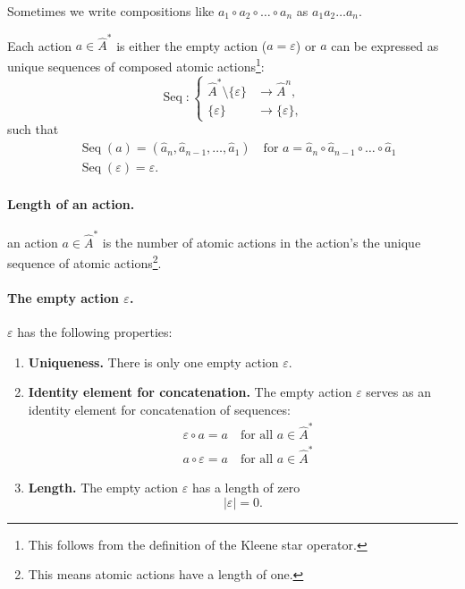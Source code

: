 \begin{notation}
	Sometimes we write compositions like $a_1 \circ a_2 \circ \dots \circ a_n$ as $a_1 a_2 \dots a_n$.
\end{notation}


Each action $a \in \hat{A}^{*}$ is either the empty action ($a = \varepsilon$) or $a$ can be expressed as unique sequences of composed atomic actions\footnote{
This follows from the definition of the Kleene star operator.
}:
\begin{equation}
    \operatorname{Seq} : \begin{cases}
        \hat{A}^{*} \setminus \{\varepsilon\} &\to \hat{A}^{n}, \\
        \{\varepsilon\} &\to \{\varepsilon\},
    \end{cases}
\end{equation}
such that
\begin{align}
    & \operatorname{Seq}(a) = (\hat{a}_{n}, \hat{a}_{n-1}, \dots, \hat{a}_{1}) \quad \text{for $a = \hat{a}_{n} \circ \hat{a}_{n-1} \circ \dots \circ \hat{a}_{1}$} \\
    & \operatorname{Seq}(\varepsilon) = \varepsilon.
\end{align}


\paragraph{Length of an action.}
 an action $a \in \hat{A}^{*}$ is the number of atomic actions in the action's the unique sequence of atomic actions\footnote{
	This means atomic actions have a length of one.
}.


\paragraph{The empty action $\varepsilon$.}
 $\varepsilon$ has the following properties:
\begin{enumerate}
    \item \textbf{Uniqueness.}
    There is only one empty action $\varepsilon$.
    \item \textbf{Identity element for concatenation.}
    The empty action $\varepsilon$ serves as an identity element for concatenation of sequences:
    \begin{align}
        \label{eqn:empty_action_is_left_identity}
        & \varepsilon \circ a = a \quad \text{for all $a \in \hat{A}^{*}$} \\
        \label{eqn:empty_action_is_right_identity}
        & a \circ \varepsilon = a \quad \text{for all $a \in \hat{A}^{*}$}
    \end{align}
    \item \textbf{Length.}
    The empty action $\varepsilon$ has a length of zero
    \begin{equation}
        |\varepsilon| = 0.
    \end{equation}
\end{enumerate}

